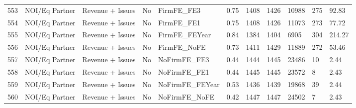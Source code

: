\documentclass{article}
\begin{document}
\begin{table}[H]
\begin{tabular}{rllllllllll}
  553 & NOI/Eq Partner & Revenue + Issues & No & FirmFE\_FE3 & 0.75 & 1408 & 1426 & 10988 & 275 & 92.83 \\ 
  554 & NOI/Eq Partner & Revenue + Issues & No & FirmFE\_FE1 & 0.75 & 1408 & 1426 & 11073 & 273 & 77.72 \\ 
  555 & NOI/Eq Partner & Revenue + Issues & No & FirmFE\_FEYear & 0.84 & 1384 & 1404 & 6905 & 304 & 214.27 \\ 
  556 & NOI/Eq Partner & Revenue + Issues & No & FirmFE\_NoFE & 0.73 & 1411 & 1429 & 11889 & 272 & 53.46 \\ 
  557 & NOI/Eq Partner & Revenue + Issues & No & NoFirmFE\_FE3 & 0.44 & 1444 & 1445 & 23486 & 10 & 2.44 \\ 
  558 & NOI/Eq Partner & Revenue + Issues & No & NoFirmFE\_FE1 & 0.44 & 1445 & 1445 & 23572 & 8 & 2.43 \\ 
  559 & NOI/Eq Partner & Revenue + Issues & No & NoFirmFE\_FEYear & 0.53 & 1436 & 1439 & 19868 & 39 & 2.44 \\ 
  560 & NOI/Eq Partner & Revenue + Issues & No & NoFirmFE\_NoFE & 0.42 & 1447 & 1447 & 24502 & 7 & 2.43 \\ 
   \hline
\end{tabular}
\end{table}
\end{document}

